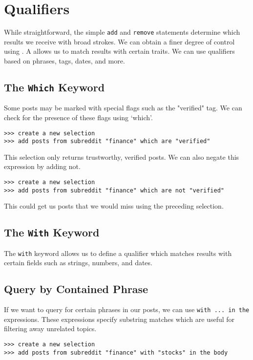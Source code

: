 \section{Qualifiers}
While straightforward, the simple \texttt{add} and \texttt{remove} statements determine which results we receive with broad strokes.
We can obtain a finer degree of control using . A  allows us to match results with certain traits.
We can use qualifiers based on phrases, tags, dates, and more.



\subsection{The \texttt{Which} Keyword}
Some posts may be marked with special flags such as the "verified" tag. We can check for the presence of these flags using ‘which’.
\newline\begin{minipage}{\linewidth}\begin{lstlisting}
>>> create a new selection
>>> add posts from subreddit "finance" which are "verified"
\end{lstlisting}\end{minipage}

This selection only returns trustworthy, verified posts. We can also negate this expression by adding not.
\newline\begin{minipage}{\linewidth}\begin{lstlisting}
>>> create a new selection
>>> add posts from subreddit "finance" which are not "verified"
\end{lstlisting}\end{minipage}

This could get us posts that we would miss using the preceding selection.



\subsection{The \texttt{With} Keyword}
The \texttt{with} keyword allows us to define a qualifier which matches results with certain fields such as strings, numbers, and dates.

\subsection{Query by Contained Phrase}
If we want to query for certain phrases in our posts, we can use \texttt{with ... in the} expressions. These expressions specify substring matches which are useful for filtering away unrelated topics.
\newline\begin{minipage}{\linewidth}\begin{lstlisting}
>>> create a new selection
>>> add posts from subreddit "finance" with "stocks" in the body
\end{lstlisting}\end{minipage}

